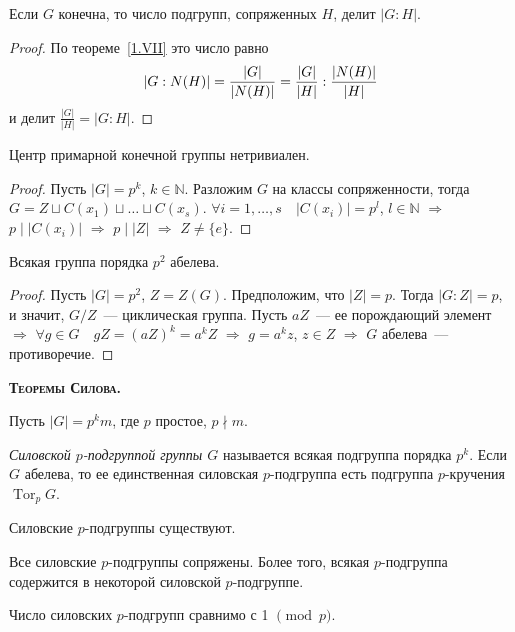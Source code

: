 \documentclass[a4paper]{article}
\newcommand*{\tema}[1]{\vspace{20pt}
\begin{center}{\textbf{\textsc{#1.}}}\vspace{5pt}
\end{center}}
\renewcommand{\Tor}{\mathop{\mathrm{Tor}}\nolimits}
\newcommand*{\p}[1]{#1\nobreak\discretionary{}{\hbox{$\mathsurround=0pt #1$}}{}}
\begin{document}
\begin{theorem}
Если $G$ конечна, то число подгрупп, сопряженных $H$, делит $|G:H|$.
\end{theorem}

\begin{proof}
По теореме~\ref{1.VII} это число равно
$$|G:N(H)|=\frac{|G|}{|N(H)|}\p=\frac{|G|}{|H|}:\frac{|N(H)|}{|H|}$$ и
делит $\frac{|G|}{|H|}=|G:H|$.
\end{proof}

\begin{theorem}
Центр примарной конечной группы нетривиален.
\end{theorem}

\begin{proof}
Пусть $|G|=p^k$, $k\in \mathbb{N}$. Разложим $G$ на классы
сопряженности, тогда $G=Z\sqcup C(x_1)\sqcup\ldots\sqcup C(x_s)$.
$\forall i=1,\ldots,s\quad |C(x_i)|=p^l$, $l\in \mathbb{N}$
$\Rightarrow$ $p\mid |C(x_i)|$ $\Rightarrow$ $p\mid |Z|$
$\Rightarrow$ $Z\neq\{e\}$.
\end{proof}

\begin{imp}
Всякая группа порядка $p^2$ абелева.
\end{imp}

\begin{proof}
Пусть $|G|=p^2$, $Z=Z(G)$. Предположим, что $|Z|=p$. Тогда
$|G:Z|=p$, и значит, $G/Z$~--- циклическая группа. Пусть $aZ$~--- ее
порождающий элемент $\Rightarrow$ $\forall g\in G\quad
gZ=(aZ)^k=a^kZ$ $\Rightarrow$ $g=a^kz$, $z\in Z$ $\Rightarrow$ $G$
абелева~--- противоречие.
\end{proof}

\tema{Теоремы Силова}

Пусть $|G|=p^km$, где $p$ простое, $p\nmid m$.

\emph{Силовской $p$-подгруппой группы $G$} называется всякая
подгруппа порядка $p^k$. Если $G$ абелева, то ее единственная
силовская $p$-подгруппа есть подгруппа $p$-кручения $\Tor_pG$.

\begin{theorem}
\label{4.VII} Силовские $p$-подгруппы существуют.
\end{theorem}

\begin{theorem}
\label{5.VII} Все силовские $p$-подгруппы сопряжены. Более того,
всякая $p$-подгруппа содержится в некоторой силовской $p$-подгруппе.
\end{theorem}

\begin{theorem}
\label{6.VII} Число силовских $p$-подгрупп сравнимо с 1 $\pmod{p}$.
\end{theorem}
\end{document}
